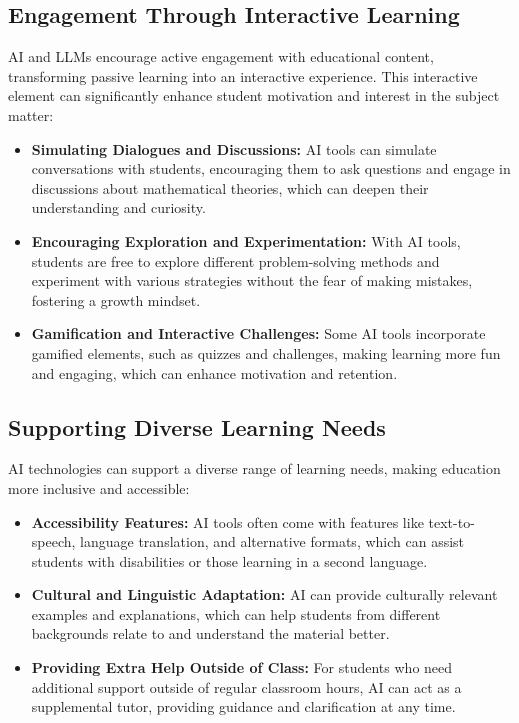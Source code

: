 \documentclass{article}
\begin{document}
\subsection{Engagement Through Interactive Learning}

AI and LLMs encourage active engagement with educational content, transforming passive learning into an interactive experience. This interactive element can significantly enhance student motivation and interest in the subject matter:

\begin{itemize}
    \item \textbf{Simulating Dialogues and Discussions:} AI tools can simulate conversations with students, encouraging them to ask questions and engage in discussions about mathematical theories, which can deepen their understanding and curiosity.
    \item \textbf{Encouraging Exploration and Experimentation:} With AI tools, students are free to explore different problem-solving methods and experiment with various strategies without the fear of making mistakes, fostering a growth mindset.
    \item \textbf{Gamification and Interactive Challenges:} Some AI tools incorporate gamified elements, such as quizzes and challenges, making learning more fun and engaging, which can enhance motivation and retention.
\end{itemize}

\subsection{Supporting Diverse Learning Needs}

AI technologies can support a diverse range of learning needs, making education more inclusive and accessible:

\begin{itemize}
    \item \textbf{Accessibility Features:} AI tools often come with features like text-to-speech, language translation, and alternative formats, which can assist students with disabilities or those learning in a second language.
    \item \textbf{Cultural and Linguistic Adaptation:} AI can provide culturally relevant examples and explanations, which can help students from different backgrounds relate to and understand the material better.
    \item \textbf{Providing Extra Help Outside of Class:} For students who need additional support outside of regular classroom hours, AI can act as a supplemental tutor, providing guidance and clarification at any time.
\end{itemize}
\end{document}
